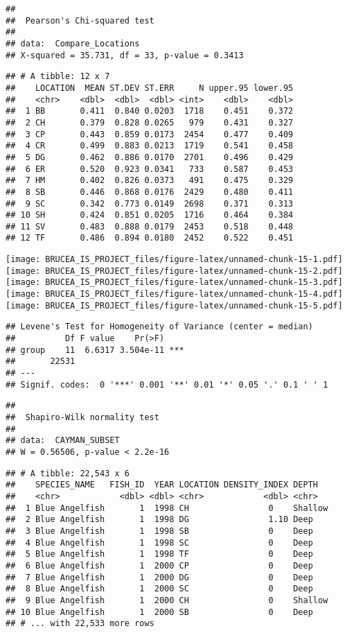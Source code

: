 \documentclass[
]{article}
\begin{document}
\begin{verbatim}
## 
##  Pearson's Chi-squared test
## 
## data:  Compare_Locations
## X-squared = 35.731, df = 33, p-value = 0.3413
\end{verbatim}

\begin{verbatim}
## # A tibble: 12 x 7
##    LOCATION  MEAN ST.DEV ST.ERR     N upper.95 lower.95
##    <chr>    <dbl>  <dbl>  <dbl> <int>    <dbl>    <dbl>
##  1 BB       0.411  0.840 0.0203  1718    0.451    0.372
##  2 CH       0.379  0.828 0.0265   979    0.431    0.327
##  3 CP       0.443  0.859 0.0173  2454    0.477    0.409
##  4 CR       0.499  0.883 0.0213  1719    0.541    0.458
##  5 DG       0.462  0.886 0.0170  2701    0.496    0.429
##  6 ER       0.520  0.923 0.0341   733    0.587    0.453
##  7 HM       0.402  0.826 0.0373   491    0.475    0.329
##  8 SB       0.446  0.868 0.0176  2429    0.480    0.411
##  9 SC       0.342  0.773 0.0149  2698    0.371    0.313
## 10 SH       0.424  0.851 0.0205  1716    0.464    0.384
## 11 SV       0.483  0.888 0.0179  2453    0.518    0.448
## 12 TF       0.486  0.894 0.0180  2452    0.522    0.451
\end{verbatim}

\texttt{[image: BRUCEA\_IS\_PROJECT\_files/figure-latex/unnamed-chunk-15-1.pdf]}
\texttt{[image: BRUCEA\_IS\_PROJECT\_files/figure-latex/unnamed-chunk-15-2.pdf]}
\texttt{[image: BRUCEA\_IS\_PROJECT\_files/figure-latex/unnamed-chunk-15-3.pdf]}
\texttt{[image: BRUCEA\_IS\_PROJECT\_files/figure-latex/unnamed-chunk-15-4.pdf]}
\texttt{[image: BRUCEA\_IS\_PROJECT\_files/figure-latex/unnamed-chunk-15-5.pdf]}

\begin{verbatim}
## Levene's Test for Homogeneity of Variance (center = median)
##          Df F value    Pr(>F)    
## group    11  6.6317 3.504e-11 ***
##       22531                      
## ---
## Signif. codes:  0 '***' 0.001 '**' 0.01 '*' 0.05 '.' 0.1 ' ' 1
\end{verbatim}

\begin{verbatim}
## 
##  Shapiro-Wilk normality test
## 
## data:  CAYMAN_SUBSET
## W = 0.56506, p-value < 2.2e-16
\end{verbatim}

\begin{verbatim}
## # A tibble: 22,543 x 6
##    SPECIES_NAME   FISH_ID  YEAR LOCATION DENSITY_INDEX DEPTH  
##    <chr>            <dbl> <dbl> <chr>            <dbl> <chr>  
##  1 Blue Angelfish       1  1998 CH                0    Shallow
##  2 Blue Angelfish       1  1998 DG                1.10 Deep   
##  3 Blue Angelfish       1  1998 SB                0    Deep   
##  4 Blue Angelfish       1  1998 SC                0    Deep   
##  5 Blue Angelfish       1  1998 TF                0    Deep   
##  6 Blue Angelfish       1  2000 CP                0    Deep   
##  7 Blue Angelfish       1  2000 DG                0    Deep   
##  8 Blue Angelfish       1  2000 SC                0    Deep   
##  9 Blue Angelfish       1  2000 CH                0    Shallow
## 10 Blue Angelfish       1  2000 SB                0    Deep   
## # ... with 22,533 more rows
\end{verbatim}
\end{document}
